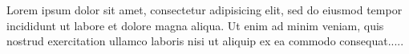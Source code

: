 Lorem ipsum dolor sit amet, consectetur adipisicing elit, sed do eiusmod tempor incididunt ut labore et dolore magna aliqua. Ut enim ad minim veniam, quis nostrud exercitation ullamco laboris nisi ut aliquip ex ea commodo consequat.....

